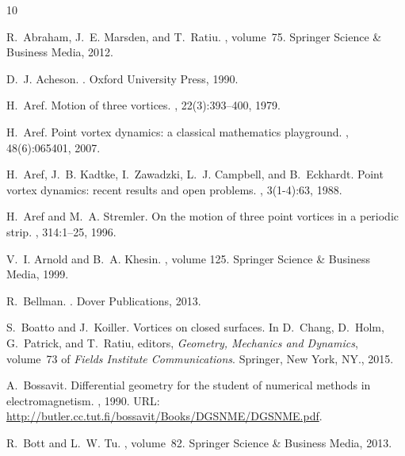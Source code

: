 \documentclass[11pt,twoside]{article}
\theoremstyle{definition}
\numberwithin{equation}{section}
\begin{document}
\begin{thebibliography}{10}

R.~Abraham, J.~E. Marsden, and T.~Ratiu.
, volume~75.
\newblock Springer Science \& Business Media, 2012.

 D.~J. Acheson.
 .
 \newblock Oxford University Press, 1990.

H.~Aref.
\newblock Motion of three vortices.
, 22(3):393--400, 1979.

H.~Aref.
\newblock Point vortex dynamics: a classical mathematics playground.
, 48(6):065401, 2007.

H.~Aref, J.~B. Kadtke, I.~Zawadzki, L.~J. Campbell, and B.~Eckhardt.
\newblock Point vortex dynamics: recent results and open problems.
, 3(1-4):63, 1988.

H.~Aref and M.~A. Stremler.
\newblock On the motion of three point vortices in a periodic strip.
, 314:1--25, 1996.

V.~I. Arnold and B.~A. Khesin.
, volume 125.
\newblock Springer Science \& Business Media, 1999.

R.~Bellman.
.
\newblock Dover Publications, 2013.

S.~Boatto and J.~Koiller.
\newblock Vortices on closed surfaces.
\newblock In D.~Chang, D.~Holm, G.~Patrick, and T.~Ratiu, editors, {\em Geometry, Mechanics and Dynamics}, volume~73 of {\em Fields Institute Communications}. Springer, New York, NY., 2015.

A.~Bossavit.
\newblock Differential geometry for the student of numerical methods in electromagnetism.
, 1990.
\newblock URL: \url{http://butler.cc.tut.fi/bossavit/Books/DGSNME/DGSNME.pdf}.

R.~Bott and L.~W. Tu.
, volume~82.
\newblock Springer Science \& Business Media, 2013.


\end{thebibliography}
\end{document}
